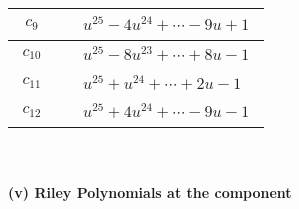 \documentclass[1p]{elsarticle_modified}
\theoremstyle{definition}
\begin{document}
\begin{tabular}{m{50pt}|m{274pt}}
\hline $$\begin{aligned}c_{9}\end{aligned}$$&$\begin{aligned}
&u^{25}-4 u^{24}+\cdots-9 u+1
\end{aligned}$\\
\hline $$\begin{aligned}c_{10}\end{aligned}$$&$\begin{aligned}
&u^{25}-8 u^{23}+\cdots+8 u-1
\end{aligned}$\\
\hline $$\begin{aligned}c_{11}\end{aligned}$$&$\begin{aligned}
&u^{25}+u^{24}+\cdots+2 u-1
\end{aligned}$\\
\hline $$\begin{aligned}c_{12}\end{aligned}$$&$\begin{aligned}
&u^{25}+4 u^{24}+\cdots-9 u-1
\end{aligned}$\\
\hline
\end{tabular}\\~\\
\newpage\renewcommand{\arraystretch}{1}
\flushleft \textbf{(v) Riley Polynomials at the component}\newline \\
\end{document}
